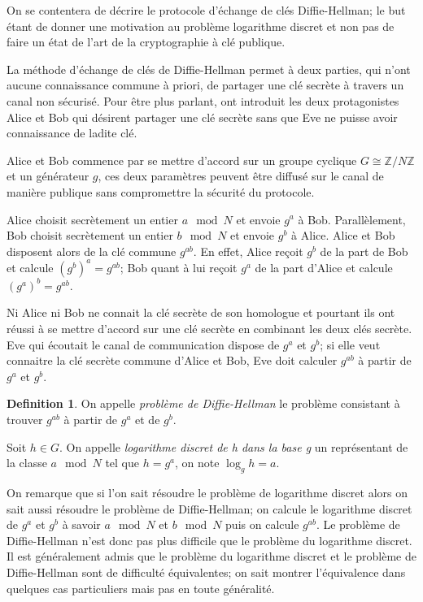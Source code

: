 \documentclass[a4paper]{article}
\theoremstyle{definition}
\newtheorem{definition}{Definition}[section]
\theoremstyle{remark}
\numberwithin{equation}{section}
\begin{document}
On se contentera de décrire le protocole d'échange de clés Diffie-Hellman; le but étant de donner une motivation au problème logarithme discret et non pas de faire un état de l'art de la cryptographie à clé publique.

La méthode d'échange de clés de Diffie-Hellman permet à deux parties, qui n'ont aucune connaissance commune à priori, de partager une clé secrète à travers un canal non sécurisé. Pour être plus parlant, ont introduit les deux protagonistes Alice et Bob qui désirent partager une clé secrète sans que Eve ne puisse avoir connaissance de ladite clé.

Alice et Bob commence par se mettre d'accord sur un groupe cyclique $G \cong \mathbb{Z}/N\mathbb{Z}$ et un générateur $g$, ces deux paramètres peuvent être diffusé sur le canal de manière publique sans compromettre la sécurité du protocole.

Alice choisit secrètement un entier $a \mod N$ et envoie $g^a$ à Bob. Parallèlement, Bob choisit secrètement un entier $b \mod N$ et envoie $g^b$ à Alice. Alice et Bob disposent alors de la clé commune $g^{ab}$. En effet, Alice reçoit $g^b$ de la part de Bob et calcule $(g^b)^a = g^{ab}$; Bob quant à lui reçoit $g^a$ de la part d'Alice et calcule $(g^a)^b = g^{ab}$.

Ni Alice ni Bob ne connait la clé secrète de son homologue et pourtant ils ont réussi à se mettre d'accord sur une clé secrète en combinant les deux clés secrète. Eve qui écoutait le canal de communication dispose de $g^a$ et $g^b$; si elle veut connaitre la clé secrète commune d'Alice et Bob, Eve doit calculer $g^{ab}$ à partir de $g^a$ et $g^b$.

\begin{definition}
On appelle \emph{problème de Diffie-Hellman} le problème consistant à trouver $g^{ab}$ à partir de $g^a$ et de $g^b$.

Soit $h \in G$. On appelle \emph{logarithme discret de h dans la base g} un représentant de la classe $a \mod N$ tel que $h=g^a$, on note $\log_g h = a$.
\end{definition}

On remarque que si l'on sait résoudre le problème de logarithme discret alors on sait aussi résoudre le problème de Diffie-Hellman; on calcule le logarithme discret de $g^a$ et $g^b$ à savoir $a \mod N$ et $b \mod N$ puis on calcule $g^{ab}$. Le problème de Diffie-Hellman n'est donc pas plus difficile que le problème du logarithme discret. Il est généralement admis que le problème du logarithme discret et le problème de Diffie-Hellman sont de difficulté équivalentes; on sait montrer l'équivalence dans quelques cas particuliers mais pas en toute généralité.
\end{document}
